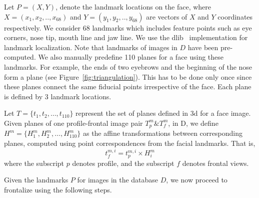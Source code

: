 Let $P = (X, Y)$, denote the landmark locations on the face, where $X=(x_1, x_2, .. , x_{68})$ and
$Y=(y_1, y_2, .. , y_{68})$ are vectors of $X$ and $Y$ coordinates respectively. We consider 68 landmarks 
which includes feature points such as eye corners, nose tip, mouth line and jaw line. 
We use the dlib~\cite{kazemi2014one} implementation for landmark localization.  Note that landmarks of images in $D$ have been pre-computed.
We also manually predefine 110 planes for a face using these landmarks. For example, the ends of two
eyebrows and the beginning of the nose form a plane (see Figure~\ref{fig:triangulation}). This has to be done
only once since these planes connect the same fiducial points irrespective of the face. Each plane is
defined by 3 landmark locations. 

Let $T = \{t_{1}, t_{2}, \ldots , t_{110}\}$
represent the set of planes defined in {\sc 3d} for a face image. Given planes of one
profile-frontal image pair $T_p^m \& T_f^m$, in D, we define $H^{m} = \{H_1^m, H_2^m, \ldots ,
H_{110}^m\}$ as the affine transformations between corresponding planes, computed using point correspondences from the facial landmarks. That is, 
\begin{equation}
  t_{f}^{m,i} = t_{p}^{m,i} \times H_i^m \label{eq:affine_transfomraiton}
\end{equation} 
where the subscript $p$ denotes profile, and the subscript $f$ denotes frontal views.

Given the landmarks $P$ for images in the database $D$, we now
proceed to frontalize using the following steps.
